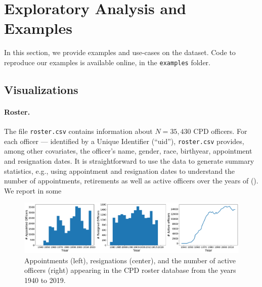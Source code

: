 
\section{Exploratory Analysis and Examples} \label{sec:analysis}

In this section, we provide examples and use-cases on the dataset. Code to reproduce our examples is available online, in the \texttt{examples} folder.

\subsection{Visualizations}

\paragraph{Roster.}
The file \texttt{roster.csv} contains information about $N=35{,}430$ CPD
officers. For each officer --- identified by a Unique Identifier (``uid''),
\texttt{roster.csv} provides, among other covariates, the officer's name,
gender, race, birthyear, appointment and resignation dates. It is
straightforward  to use the data to generate summary statistics, e.g., using
appointment and resignation dates to understand the number of appointments,
retirements as well as active officers over the years of  ().
We report in  some 
\begin{figure}[t!] 
\includegraphics[width=\textwidth]{figs/history} 
\caption{Appointments (left), resignations (center), and the number of active
officers (right) appearing in the CPD roster database from the years 1940 to 2019.}
\label{fig:history}
\end{figure}

